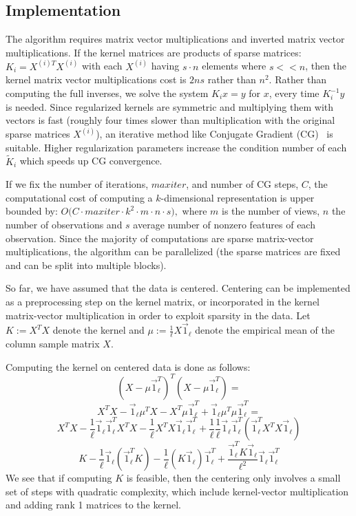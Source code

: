 \subsection{Implementation}\label{chap:extensions:implementation}
The algorithm requires matrix vector multiplications and inverted
matrix vector multiplications. If the kernel matrices are products of
sparse matrices: $K_i = X^{(i)T} X^{(i)}$ with each $X^{(i)}$ having
$s\cdot n$ elements
where $s << n$, then the kernel matrix vector multiplications cost is $2 n s$
rather than $n^2$. Rather than computing the full inverses, we solve
the system $K_i x = y$ for $x$, every time $K_i^{-1} y$ is needed. Since
regularized kernels are symmetric and multiplying them with vectors is
fast (roughly four times slower than multiplication with the original
sparse matrices $X^{(i)}$), an iterative method like Conjugate Gradient (CG)~\cite{golub} is
suitable. Higher regularization parameters increase the condition
number of each $\tilde{K}_i$ which speeds up CG convergence.
\par
If we fix the number of iterations, $maxiter$, and number
of CG steps, $C$, the computational cost of computing a
$k$-dimensional representation is upper bounded by: $O\big(C \cdot
maxiter \cdot k^2 \cdot m \cdot n \cdot s \big),$ where $m$ is the
number of views, $n$ the number of observations and $s$ average number
of nonzero features of each observation.
Since the majority of computations are  sparse matrix-vector multiplications, the
algorithm can be parallelized (the sparse matrices are fixed and can be split into multiple
blocks).

So far, we have assumed that the data is centered. Centering can be implemented
as a preprocessing step on the kernel matrix, or incorporated in the kernel
matrix-vector multiplication in order to exploit sparsity in the data.
Let $K := X^T X$ denote the kernel and $\mu := \frac{1}{\ell} X \vec{1}_\ell$
denote the empirical mean of the column sample matrix $X$.

Computing the kernel on centered data is done as follows:
$$(X - \mu \vec{1}_\ell^T)^T (X - \mu \vec{1}_\ell^T) = $$
$$X^T X  - \vec{1}_\ell \mu^T X  - X^T \mu \vec{1}_\ell^T  +  \vec{1}_\ell \mu^T \mu \vec{1}_\ell^T = $$
$$ X^T X - \frac{1}{\ell} \vec{1}_\ell \vec{1}_\ell^T X^T X  -  \frac{1}{\ell} X^T X \vec{1}_\ell \vec{1}_\ell^T
+ \frac{1}{\ell} \frac{1}{\ell} \vec{1}_\ell \vec{1}_\ell^T (\vec{1}_\ell^T X^T X \vec{1}_\ell)$$
$$ K - \frac{1}{\ell} \vec{1}_\ell (\vec{1}_\ell^T K) - \frac{1}{\ell} (K \vec{1}_\ell)\vec{1}_\ell^T +
\frac{\vec{1}_\ell^T K \vec{1}_\ell}{\ell^2} \vec{1}_\ell \vec{1}_\ell^T$$
We see that if computing $K$ is feasible, then the centering only involves a small set of
steps with quadratic complexity, which include kernel-vector multiplication and adding rank 1 matrices to the kernel.

